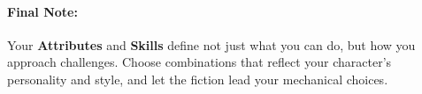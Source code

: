 \begin{multicols}{2}
\paragraph{Final Note:}
Your \textbf{Attributes} and \textbf{Skills} define not just what you can do, but how you approach challenges. Choose combinations that reflect your character's personality and style, and let the fiction lead your mechanical choices.

\end{multicols}

